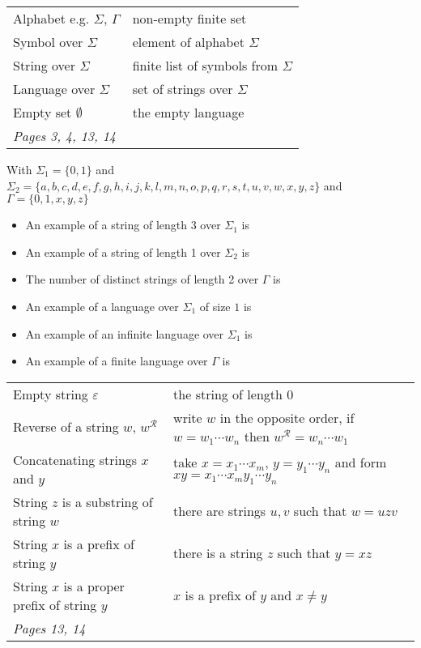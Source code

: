 
\begin{center}
    \begin{tabular}{|ll|}
    \hline
    Alphabet e.g. $\Sigma$, $\Gamma$ & 	non-empty finite set	 \\
    Symbol over $\Sigma$  & element of alphabet $\Sigma$\\
    String over $\Sigma$  &	finite list of symbols from $\Sigma$\\
    Language over $\Sigma$& set of strings over $\Sigma$ \\
    Empty set $\emptyset$ & the empty language\\
    \hline
    {\it Pages 3, 4, 13, 14 }& \\
    \hline
    \end{tabular}
    \end{center}
    
    With $\Sigma_1 = \{0,1\}$ and $\Sigma_2 = \{a,b,c,d,e,f,g,h,i,j,k,l,m,n,o,p,q,r,s,t,u,v,w,x,y,z\}$  and $\Gamma = \{0,1,x,y,z\}$
    
    \begin{itemize}
    \setlength{\itemsep}{10pt}
    \item[] An example of a string of length 3 over $\Sigma_1$ is 
    \item[] An example of  a string of length 1 over $\Sigma_2$ is 
    \item[] The number of distinct strings of length 2 over $\Gamma$ is
    \item[] An example of a language over $\Sigma_1$ of size $1$ is
    \item[] An example of an infinite language over $\Sigma_1$ is
    \item[] An example of  a finite language over $\Gamma$ is
    
    \end{itemize}
    
    \begin{center}
    \begin{tabular}{|ll|}
    \hline
    Empty string $\varepsilon$ & the string of length 0\\
    Reverse of a string $w$, $w^\mathcal{R}$  & write $w$  in  the opposite order, if $w = w_1 \cdots  w_n$ then $w^\mathcal{R} = w_n \cdots  w_1$\\
    Concatenating strings $x$ and $y$ & take $x = x_1 \cdots x_m$, $y=y_1 \cdots y_n$ and form $xy = x_1 \cdots x_m y_1 \cdots y_n$\\
    String $z$ is a substring of string $w$ & there are strings $u,v$ such that $w = uzv$\\
    String $x$ is a prefix of string $y$ & there is a string $z$ such that $y = xz$ \\
    String $x$ is a proper prefix of string $y$ & $x$ is a prefix of $y$ and $x \neq y$\\
    \hline
    {\it Pages 13, 14} & \\
    \hline
    \end{tabular}
    \end{center}
    
